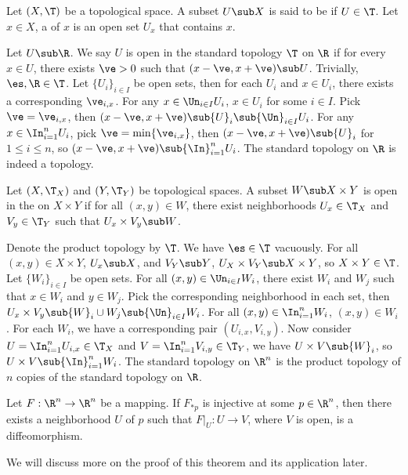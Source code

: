 \documentclass[10pt]{article}
\begin{document}
\begin{definition}
    Let $(X,\T)$ be a topological space. A subset $U\sub X$ is said to be  if $U\in\T$. Let $x\in X$, a  of $x$ is an open set ${U}_{x}$ that contains $x$.
\end{definition}
\par
Let $U\sub\R$. We say $U$ is open in the standard topology $\T$ on $\R$ if for every $x\in U$, there exists $\ve>0$ such that $(x-\ve,x+\ve)\sub U$. Trivially, $\es,\R\in\T$. Let ${\{{U}_{i}\}}_{i\in I}$ be open sets, then for each ${U}_{i}$ and $x\in{U}_{i}$, there exists a corresponding ${\ve}_{i,x}$. For any $x\in{\Un}_{i\in I}{U}_{i}$, $x\in{U}_{i}$ for some $i\in I$. Pick $\ve={\ve}_{i,x}$, then $(x-\ve,x+\ve)\sub {U}_{i}\sub{\Un}_{i\in I}{U}_{i}$. For any $x\in{\In}_{i=1}^{n}{U}_{i}$, pick $\ve=\min\{{\ve}_{i,x}\}$, then $(x-\ve,x+\ve)\sub{U}_{i}$ for $1\le i\le n$, so $(x-\ve,x+\ve)\sub{\In}_{i=1}^{n}{U}_{i}$. The standard topology on $\R$ is indeed a topology.
\begin{definition}
    Let $(X,{\T}_{X})$ and $(Y,{\T}_{Y})$ be topological spaces. A subset $W\sub X\times Y$ is open in the  on $X\times Y$ if for all $(x,y)\in W$, there exist neighborhoods ${U}_{x}\in{\T}_{X}$ and ${V}_{y}\in{\T}_{Y}$ such that ${U}_{x}\times{V}_{y}\sub W$.
\end{definition}
\par
Denote the product topology by $\T$. We have $\es\in\T$ vacuously. For all $(x,y)\in X\times Y$, ${U}_{x}\sub X$, and ${V}_{Y}\sub Y$, ${U}_{X}\times{V}_{Y}\sub X\times Y$, so $X\times Y\in\T$. Let ${\{{W}_{i}\}}_{i\in I}$ be open sets. For all $(x,y)\in{\Un}_{i\in I}{W}_{i}$, there exist ${W}_{i}$ and ${W}_{j}$ such that $x\in{W}_{i}$ and $y\in{W}_{j}$. Pick the corresponding neighborhood in each set, then ${U}_{x}\times{V}_{y}\sub{W}_{i}\cup{W}_{j}\sub{\Un}_{i\in I}{W}_{i}$. For all $(x,y)\in{\In}_{i=1}^{n}{W}_{i}$, $(x,y)\in{W}_{i}$. For each ${W}_{i}$, we have a corresponding pair $({U}_{i,x},{V}_{i,y})$. Now consider $U={\In}_{i=1}^{n}{U}_{i,x}\in{\T}_{X}$ and $V={\In}_{i=1}^{n}{V}_{i,y}\in{\T}_{Y}$, we have $U\times V\sub{W}_{i}$, so $U\times V\sub{\In}_{i=1}^{n}{W}_{i}$. The standard topology on ${\R}^{n}$ is the product topology of $n$ copies of the standard topology on $\R$.
\begin{theorem}
    Let $F:{\R}^{n}\to{\R}^{n}$ be a mapping. If ${F}_{*p}$ is injective at some $p\in{\R}^{n}$, then there exists a neighborhood $U$ of $p$ such that $F{\vert}_{U}:U\to V$, where $V$ is open, is a diffeomorphism.
\end{theorem}
\par
We will discuss more on the proof of this theorem and its application later.
\end{document}
